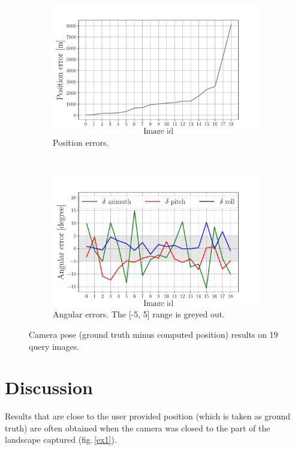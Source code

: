 \documentclass[fleqn,10pt]{wlpeerj} %
\begin{document}
\begin{figure}[H]
\centering
\begin{subfigure}{0.48\linewidth}
    \includegraphics[width=1\linewidth]{pos.pdf}
    \caption{Position errors.}
    \label{pose:1}
\end{subfigure}
~
\begin{subfigure}{0.48\linewidth}
    \includegraphics[width=1\linewidth]{angles.pdf}
    \caption{Angular errors. The [-5, 5] range is greyed out.}
    \label{pose:2}
\end{subfigure}
\caption{Camera pose (ground truth minus computed position) results on 19 query images.}
\label{pose}
\end{figure}




\section*{Discussion}
Results that are close to the user provided position (which is taken as ground truth) 
are often obtained when the camera was closed to the part of the landscape 
captured (fig.\,\ref{ex1}).
\end{document}
